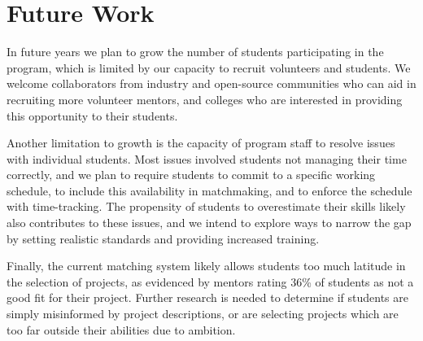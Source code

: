 \section{Future Work}

In future years we plan to grow the number of students participating in the program, which is limited by our capacity to recruit volunteers and students. We welcome collaborators from industry and open-source communities who can aid in recruiting more volunteer mentors, and colleges who are interested in providing this opportunity to their students.

Another limitation to growth is the capacity of program staff to resolve issues with individual students. Most issues involved students not managing their time correctly, and we plan to require students to commit to a specific working schedule, to include this availability in matchmaking, and to enforce the schedule with time-tracking.  The propensity of students to overestimate their skills likely also contributes to these issues, and we intend to explore ways to narrow the gap by setting realistic standards and providing increased training.

Finally, the current matching system likely allows students too much latitude in the selection of projects, as evidenced by mentors rating 36\% of students as not a good fit for their project. Further research is needed to determine if students are simply misinformed by project descriptions, or are selecting projects which are too far outside their abilities due to ambition.